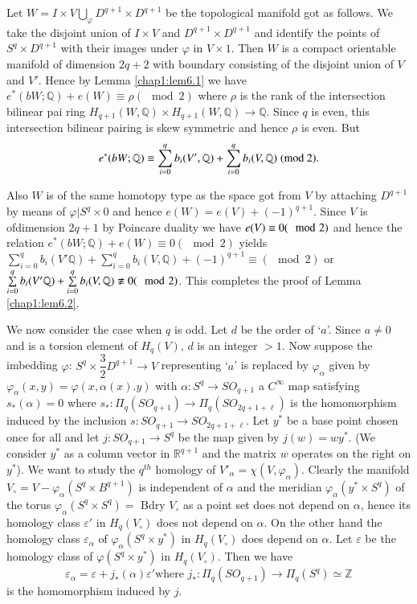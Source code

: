 Let $W = I \times V \bigcup\limits_\varphi D^{q+1} \times D^{q+1}$ be
the topological manifold got as follows. We take the disjoint union of
$I \times V$ and $ D^{q+1} \times D^{q+1}$ and identify the points of
$S^q \times D^{q+1}$ with their images under $\varphi$ in $V \times
1$. Then $W$ is a compact orientable manifold of dimension $2q + 2$
with boundary consisting of the disjoint union of $V$ and $V'$. Hence
by Lemma \ref{chap1:lem6.1} we have $e^* (bW; \mathbb{Q}) + e(W) \equiv \rho(\mod 2)$
where $\rho$ is the rank of the intersection bilinear pai ring
$H_{q+1}(W, \mathbb{Q}) \times H_{q+1} (W, \mathbb{Q}) \to
\mathbb{Q}$. Since $q$ is even, this intersection bilinear pairing is
skew symmetric and hence $\rho$ is even. But 
$$
e^* (bW ; \mathbb{Q})
\equiv \sum\limits^{q}_{i=0} b_i (V', \mathbb{Q})+
\sum\limits^{q}_{i=0} b_i (V, \mathbb{Q}) \; (\rm{mod} ~ 2).
$$

 Also $W$ is of
the same homotopy type as the space got from $V$ by attaching
$D^{q+1}$ by means of $\varphi | S^q \times 0$ and hence $e(W) = e(V)
+ (-1)^{q+1}$. Since $V$ is of\pageoriginale dimension $2q+1$ by
Poincare duality we 
have $e (V) \equiv 0\break (\mod 2)$ and hence the relation $e^* (bW ;
\mathbb{Q}) + e (W) \equiv 0 (\mod 2)$ yields $\sum\limits^{q}_{i=0}
b_i (V' \mathbb{Q})+ \sum\limits^{q}_{i=0} b_i (V, \mathbb{Q}) +
(-1)^{q+1} \equiv (\mod 2)$ or $\sum\limits^{q}_{i=0} b_i (V'
\mathbb{Q})+ \sum\limits^{q}_{i=0} b_i (V,\break \mathbb{Q}) \not\equiv 0
(\mod 2)$. This completes the proof of Lemma \ref{chap1:lem6.2}. 

We now consider the case when $q$ is odd. Let $d$ be the order of
`$a$'. Since $a \neq 0$ and is a torsion element of $H_q (V)$, $d$ is
an integer $> 1$. Now suppose the imbedding $\varphi$: $S^q \times
\dfrac{3}{2} D^{q+1} \to V$ representing `$a$' is replaced by
$\varphi_\alpha$ given by $\varphi_\alpha (x, y) = \varphi (x, \alpha
(x).y)$ with $\alpha: S^q \to S O_{q+1}$ a $C^\infty $ map satisfying
$s_* (\alpha ) = 0$ where $s_*: \Pi_q (SO_{q+1}) \to \Pi_q
(SO_{2q+1+\ell})$ is the homomorphism induced by the inclusion $s:
SO_{q+1} \to SO_{2q +1+ \ell}$. Let $y^*$ be a base point chosen once
for all and let $j: SO_{q+1} \to S^q$ be the map given by $j
(w)= w y^*$. (We consider $y^*$ as a column vector in
$\mathbb{R}^{q+1}$ and the matrix $w$ operates on the right on
$y^*$). We want to study the $q^{th}$ homology of $V'_{\alpha} = \chi
(V, \varphi_\alpha)$. Clearly the manifold $V_\circ = V- \varphi_{\alpha}
(S^q \times B^{q+1})$ is independent of $\alpha$ and the meridian
$\varphi_\alpha (y^* \times S^q)$ of the torus $\varphi_\alpha (S^q
\times S^q)=$ Bdry $V_\circ$ as a point set does not depend on $\alpha$,
hence its homology class $\varepsilon'$ in $H_q (V_\circ)$ does not depend
on $\alpha$. On the other hand the homology class $\varepsilon_\alpha$
of $\varphi_\alpha (S^q \times y^*)$ in $H_q (V_\circ)$ does depend on
$\alpha$. Let $\varepsilon $ be the homology class of $\varphi (S^q
\times y^*)$ in $H_q (V_\circ)$. Then we have   
$$ 
\varepsilon_\alpha = \varepsilon + j_* (\alpha) \varepsilon' \text{
  where }  j_* : \Pi_q (SO_{q+1}) \to \Pi_q (S^q) \simeq \mathbb{Z}  
$$\pageoriginale
 is the homomorphism induced by $j$. 

